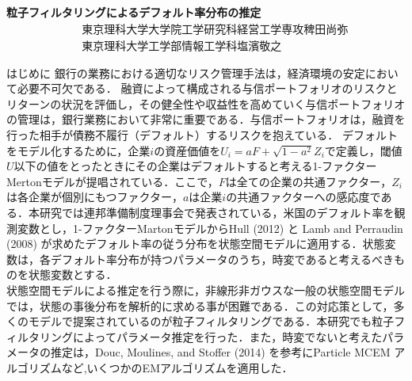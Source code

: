 \documentclass[a4j,11pt]{jarticle}
\makeatletter
\def\section{\@startsection{section}{1}{\z@}
   {0\Cvs \@plus.5\Cdp \@minus.2\Cdp}
   {0.01\Cvs \@plus.3\Cdp}
   {\normalfont \Large \bfseries}}
\makeatother
\begin{document}
\begin{center}
{\Large \textbf{粒子フィルタリングによるデフォルト率分布の推定}}\\
\begin{eqnarray*}
&&東京理科大学大学院工学研究科経営工学専攻　稗田 尚弥\\
&&東京理科大学工学部情報工学科　　　　　　　塩濱 敬之
\end{eqnarray*}
\end{center}
\begin{flushright}

\end{flushright}
\vspace{-3zw}
\section{はじめに}
銀行の業務における適切なリスク管理手法は，経済環境の安定において必要不可欠である．
融資によって構成される与信ポートフォリオのリスクとリターンの状況を評価し，その健全性や収益性を高めていく与信ポートフォリオの管理は，銀行業務において非常に重要である．与信ポートフォリオは，融資を行った相手が債務不履行（デフォルト）するリスクを抱えている．
デフォルトをモデル化するために，企業$i$の資産価値を$U_i = a F + \sqrt{1-a^2}Z_i$で定義し，閾値$U$以下の値をとったときにその企業はデフォルトすると考える1-ファクターMertonモデルが提唱されている．ここで，$F$は全ての企業の共通ファクター，$Z_i$は各企業が個別にもつファクター，$a$は企業$i$の共通ファクターへの感応度である．本研究では連邦準備制度理事会で発表されている，米国のデフォルト率を観測変数とし，1-ファクターMartonモデルからHull (2012) と Lamb and Perraudin (2008) が求めたデフォルト率の従う分布を状態空間モデルに適用する．状態変数は，各デフォルト率分布が持つパラメータのうち，時変であると考えるべきものを状態変数とする．\\
\hspace{4mm}状態空間モデルによる推定を行う際に，非線形非ガウスな一般の状態空間モデルでは，状態の事後分布を解析的に求める事が困難である．この対応策として，多くのモデルで提案されているのが粒子フィルタリングである．本研究でも粒子フィルタリングによってパラメータ推定を行った．また，時変でないと考えたパラメータの推定は，Douc, Moulines, and Stoffer (2014) を参考にParticle MCEM アルゴリズムなど,いくつかのEMアルゴリズムを適用した．
\end{document}
